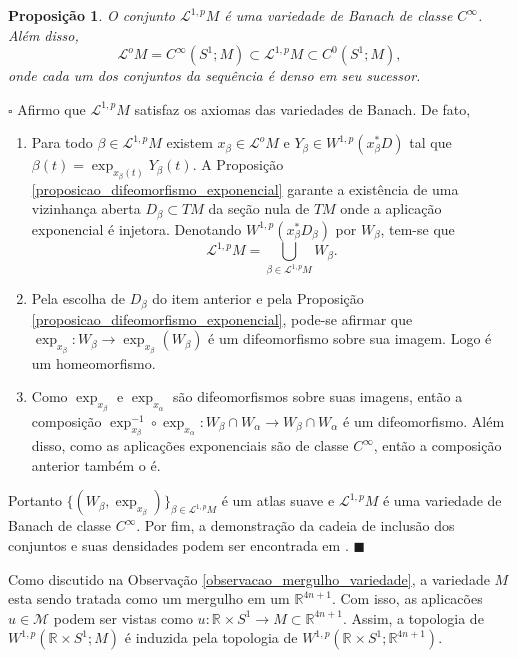 \documentclass[12pt]{book}
\newtheorem{proposicao}[teorema]{Proposição}
\newenvironment{prova}[1]{$\square$ #1}{\hfill$\blacksquare$}
\newcommand{\caminhosexponenciaisSobolev}{\mathcal{L}^{1,p}M}
\newcommand{\circulo}{S^{1}}
\newcommand{\energiafinitaM}{\mathcal{M}}
\newcommand{\espacosobolev}[1]{W^{1,p}(#1)}
\newcommand{\espacosobolevcontradominio}[2]{W^{1,p}(#1;#2)}
\newcommand{\retacartesianocirculo}{\real{} \times \circulo}
\newcommand{\real}[1]{\mathbb{R}^{#1}}
\newcommand{\lacocontrateis}{\mathcal{L}^{o}M}
\begin{document}
	\begin{proposicao}\label{proposicao_caminhos_variedade_banach}
		O conjunto $\caminhosexponenciaisSobolev$ é uma variedade de Banach de classe $C^{\infty}$. Além disso, 
		$$
		\lacocontrateis = C^{\infty}(\circulo;M) \subset  \caminhosexponenciaisSobolev\subset C^{0}(\circulo;M),
		$$
		onde cada um dos conjuntos da sequência é denso em seu sucessor.
	\end{proposicao}
	\begin{prova}
		Afirmo que $\caminhosexponenciaisSobolev$ satisfaz os axiomas das variedades de Banach. De fato,
		\begin{enumerate}
			\item Para todo $\beta \in \caminhosexponenciaisSobolev $ existem $x_{\beta} \in \lacocontrateis$ e $Y_{\beta} \in \espacosobolev{x_{\beta}^{*}D}$ tal que $\beta(t)=\exp_{x_{\beta}(t)}Y_{\beta}(t)$. A Proposição \ref{proposicao_difeomorfismo_exponencial} garante a existência de uma vizinhança aberta $D_{\beta} \subset TM$ da seção nula de $TM$ onde a aplicação exponencial é injetora. Denotando $\espacosobolev{x_{\beta}^{*}D_{\beta}}$ por $W_{\beta}$, tem-se que
			$$
			\caminhosexponenciaisSobolev = \bigcup_{\beta \in \caminhosexponenciaisSobolev } W_{\beta}.
			$$
			
			\item Pela escolha de $D_{\beta}$ do item anterior e pela Proposição \ref{proposicao_difeomorfismo_exponencial}, pode-se afirmar que $\exp_{x_{\beta}}:W_{\beta} \to \exp_{x_{\beta}}(W_{\beta})$ é um difeomorfismo sobre sua imagem. Logo é um homeomorfismo.
			
			\item Como $\exp_{x_{\beta}}$ e $\exp_{x_{\alpha}}$ são difeomorfismos sobre suas imagens, então a composição $\exp_{x_{\beta}}^{-1} \circ \exp_{x_{\alpha}} :W_{\beta} \cap W_{\alpha} \to W_{\beta} \cap W_{\alpha}$ é um difeomorfismo. Além disso, como as aplicações exponenciais são de classe $C^{\infty}$, então a composição anterior também o é.
		\end{enumerate}
		
		Portanto $\{(W_{\beta}, \exp_{x_{\beta}}) \}_{\beta \in \caminhosexponenciaisSobolev}$ é um atlas suave e $\caminhosexponenciaisSobolev$ é uma variedade de Banach de classe $C^{\infty}$. Por fim, a demonstração da cadeia de inclusão dos conjuntos e suas densidades podem ser encontrada em \cite{matthias_morse_homology}.
	\end{prova}
	
	Como discutido na Observação \ref{observacao_mergulho_variedade}, a variedade $M$ esta sendo tratada como um mergulho em um $\real{4n+1}$. Com isso, as aplicacões $u \in \energiafinitaM$ podem ser vistas como $u:\retacartesianocirculo\to M \subset \real{4n+1}$. Assim, a topologia de $\espacosobolevcontradominio{\retacartesianocirculo}{M}$ é induzida pela topologia de $\espacosobolevcontradominio{\retacartesianocirculo}{\real{4n+1}}$. 
	
\end{document}
